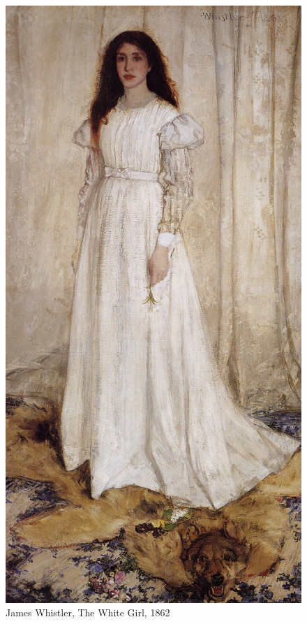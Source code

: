 \begin{figure}[h]
	\centering
	\includegraphics[width=12cm]{inspire/WhiteGirl.jpg}
	\caption{James Whistler, The White Girl, 1862}
	\label{fig:WhireGirl}
\end{figure}


